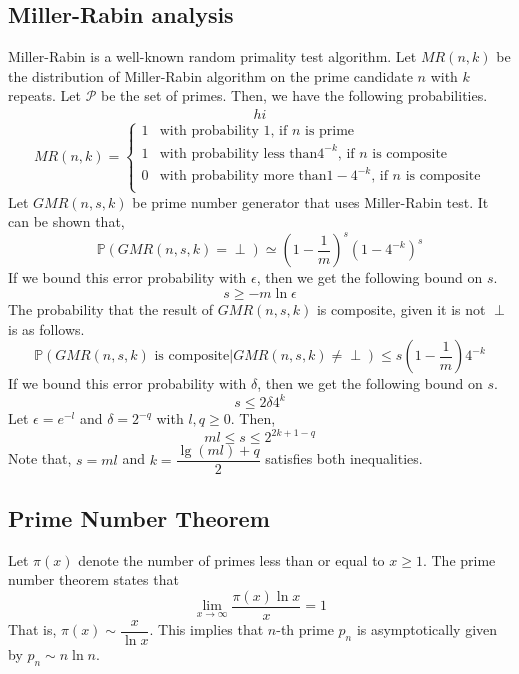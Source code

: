 \documentclass{article}
\begin{document}
\subsection{Miller-Rabin analysis}
Miller-Rabin is a well-known random primality test algorithm. Let \(MR(n,k)\) be the distribution of Miller-Rabin algorithm on the prime candidate \(n\) with \(k\) repeats. Let \(\mathcal{P}\) be the set of primes. Then, we have the following probabilities.
\begin{align}
	hi
\end{align}
\begin{equation*}
	MR(n,k) = \begin{cases}
		1 & \text{with probability 1, if } n \text{ is prime}\\
		1 & \text{with probability less than} 4^{-k} \text{, if } n \text{ is composite}\\
		0 & \text{with probability more than} 1- 4^{-k} \text{, if } n \text{ is composite}\\
	\end{cases}
\end{equation*}
Let \(GMR(n,s,k)\) be prime number generator that uses Miller-Rabin test. It can be shown that,
\begin{equation*}
	\mathbb{P}(GMR(n,s,k) = \perp) \simeq ( 1 - \frac{1}{m})^s (1 - 4^{-k})^s
\end{equation*}
If we bound this error probability with \(\epsilon\), then we get the following bound on \(s\).
\begin{equation*}
	s \geq -m \ln \epsilon
\end{equation*}
The probability that the result of \(GMR(n,s,k)\) is composite, given it is not \(\perp\) is as follows.
\begin{equation*}
	\mathbb{P}(GMR(n,s,k) \text{ is composite}| GMR(n,s,k) \neq \perp ) \leq s (1 - \frac{1}{m}) 4^{-k}
\end{equation*}
If we bound this error probability with \(\delta\), then we get the following bound on \(s\).
\begin{equation*}
	s \leq 2 \delta 4^k
\end{equation*}
Let \(\epsilon = e^{-l}\) and \(\delta = 2^{-q}\) with \(l,q \geq 0\). Then, 
\begin{equation*}
	ml \leq s \leq 2^{2k + 1 - q}
\end{equation*}
Note that, \(s = ml\) and \(k = \dfrac{\lg(ml) + q}{2}\) satisfies both inequalities.

\subsection{Prime Number Theorem}
\begin{theorem}\label{thm:pnt}
	Let \(\pi(x)\) denote the number of primes less than or equal to \(x \geq 1\). The prime number theorem states that 
	\begin{equation*}
		\lim_{x \to \infty} \dfrac{\pi(x) \ln x}{x} = 1
	\end{equation*}
	That is, \(\pi(x) \sim \dfrac{x}{\ln x}\). This implies that \(n\)-th prime \(p_n\) is asymptotically given by \(p_n \sim n \ln n\).
\end{theorem}
\end{document}
